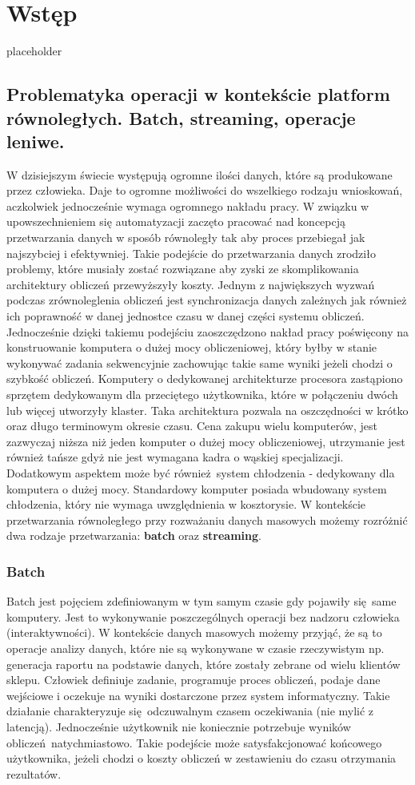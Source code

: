 \chapter{Wstęp} \label{chap.introduction}
{placeholder}

\section{Problematyka operacji w kontekście platform równoległych. Batch, streaming, operacje leniwe.}
W dzisiejszym świecie występują ogromne ilości danych, które są produkowane przez człowieka. Daje to ogromne możliwości do wszelkiego rodzaju wnioskowań, aczkolwiek jednocześnie wymaga ogromnego nakładu pracy. W związku w upowszechnieniem się automatyzacji zaczęto pracować nad koncepcją przetwarzania danych w sposób równoległy tak aby proces przebiegał jak najszybciej i efektywniej. Takie podejście do przetwarzania danych zrodziło problemy, które musiały zostać rozwiązane aby zyski ze skomplikowania architektury obliczeń przewyższyły koszty. Jednym z największych wyzwań podczas zrównoleglenia obliczeń jest synchronizacja danych zależnych jak również ich poprawność w danej jednostce czasu w danej części systemu obliczeń. Jednocześnie dzięki takiemu podejściu zaoszczędzono nakład pracy poświęcony na konstruowanie komputera o dużej mocy obliczeniowej, który byłby w stanie wykonywać zadania sekwencyjnie zachowując takie same wyniki jeżeli chodzi o szybkość obliczeń. Komputery o dedykowanej architekturze procesora zastąpiono sprzętem dedykowanym dla przeciętego użytkownika, które w połączeniu dwóch lub więcej utworzyły klaster. Taka architektura pozwala na oszczędności w krótko oraz długo terminowym okresie czasu. Cena zakupu wielu komputerów, jest zazwyczaj niższa niż jeden komputer o dużej mocy obliczeniowej, utrzymanie jest również tańsze gdyż nie jest wymagana kadra o wąskiej specjalizacji. Dodatkowym aspektem może być również system chłodzenia - dedykowany dla komputera o dużej mocy. Standardowy komputer posiada wbudowany system chłodzenia, który nie wymaga uwzględnienia w kosztorysie. W kontekście przetwarzania równoległego przy rozważaniu danych masowych możemy rozróżnić dwa rodzaje przetwarzania: \textbf{batch} oraz \textbf{streaming}.
\subsection{Batch}\label{batch_subsection} 
Batch jest pojęciem zdefiniowanym w tym samym czasie gdy pojawiły się same komputery. Jest to wykonywanie poszczególnych operacji bez nadzoru człowieka (interaktywności). W kontekście danych masowych możemy przyjąć, że są to operacje analizy danych, które nie są wykonywane w czasie rzeczywistym np. generacja raportu na podstawie danych, które zostały zebrane od wielu klientów sklepu. Człowiek definiuje zadanie, programuje proces obliczeń, podaje dane wejściowe i oczekuje na wyniki dostarczone przez system informatyczny. Takie działanie charakteryzuje się odczuwalnym czasem oczekiwania (nie mylić z latencją). Jednocześnie użytkownik nie koniecznie potrzebuje wyników obliczeń natychmiastowo. Takie podejście może satysfakcjonować końcowego użytkownika, jeżeli chodzi o koszty obliczeń w zestawieniu do czasu otrzymania rezultatów.
